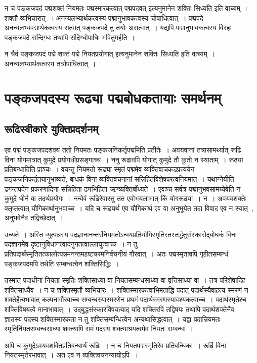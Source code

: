 				न च पङ्कजपदं पद्मशक्तं नियमतः पद्मस्मारकत्वात् पद्मपदवत् इत्यनुमानेन शक्तिः सिध्यति इति वाच्यम्~।  शक्तौ व्यभिचारात्~।  अनन्यलभ्यार्थकत्वस्य  पद्मानुभावकत्वस्य चोपाधित्वात्~। पद्मपदे अनन्यलभ्यपद्मार्थकत्वस्य सत्वात् पङ्कजपदे तु तयोः असत्वात्~।  यद्यपि पद्मानुभावकत्वस्य विरहः पङ्कजपदे सन्दिग्धः तथापि संदिग्धोपाधिः भवितुमर्हति~। 	

				न चैवं पङ्कजपदं पद्मे शक्तं पद्मे नियतप्रयोगात् इत्यनुमानेन शक्तिः सिध्यति इति वाच्यम्~।  अनन्यलभ्यार्थकत्वस्य तत्रोपाधित्वात्~। 

	\section{पङ्कजपदस्य रूढ्या पद्मबोधकतायाः समर्थनम्}
		
		\subsection{रूढिस्वीकारे युक्तिप्रदर्शनम्} 

			\begin{small}
			
				एवं पद्मं पङ्कजपदशक्यं ततो नियमतः पङ्कजनिकर्तृपद्ममिति प्रतीतेः~। अवयवानां तत्रासामर्थ्यात् रूढिं विना योगमात्रात् कुमुदे प्रयोगधीप्रसङ्गाच्च~। ननु रूढावपि योगात् कुमुदे तौ कुतो न स्याताम्~। रूढ्या प्रतिबन्धादिति प्राञ्चः~। वयन्तु नियमतो रूढ्या स्मृतं पद्ममेव व्यक्तिवाचकडप्रत्ययेन पङ्कजनिकर्तृतयानुभाव्यते, बाधकं विना व्यक्तिवचनानां सन्निहितविशेषपरत्वनियमात्~। यथाग्नेयीति ढगन्तपदेन प्रकरणादिना सन्निहिता ढगभिहिता ऋग्व्यक्तिर्बोध्यते~। एवञ्च सर्वत्र पद्मानुभवसामग्र्येवेति न कुमुदे धीर्न वा तदर्थप्रयोगः~। नन्वेवं रूढिरेवास्तु तत एवोभयलाभात् किं योगरूढ्या~। न~। अवयवशक्तेः क्लृप्तत्वात् यौगिकार्थानुभवाच्च~। यदि च रूढ्यर्थ एव यौगिकार्थ एव वा अनुभूयेत तदा विवाद एव न स्यात्~, अनुभवेनैव तद्विच्छेदात्~। 
				
				उच्यते~। अस्ति व्युत्पन्नस्य पदज्ञानानन्तरंनियमतोऽन्वयप्रतियोगिस्मृतिरतस्तद्धेतुसंस्कारोद्बोधकं विना पदज्ञानमेव दृष्टानुविधानत्वादनुगतत्वाल्लाघुत्वाच्च~। न तु प्रतिपदार्थस्मृतितत्कालोत्पन्नमनन्तमहष्टचरमनिर्वचनीयं गौरवात्~। अतः पद्मस्मृतावपि गृहीतसम्बन्धं पङ्कजपदमपि तथेति सम्बन्धत्वेन शक्तिसिद्धिः~। 
			
				तस्मात् पदाधीना नियता स्मृतिः शक्तिसाध्या वा नियतसम्बन्धसाध्या वा वृत्तिसाध्या वा~। तत्र परिशेषादिह शक्तिसाध्यैव~। न च शक्तिस्मृतौ व्यभिचारः~। शक्तिस्मारकत्वाभिमताद्धि पदात् पदार्थस्यैवाहत्य स्मरणं न शक्तेर्हेत्वभावात् कल्पनागौरवाच्च सम्बन्धस्यास्मरणेन प्रथमं पदार्थस्मरणस्यावश्यकत्वाच्च~। पदार्थस्मृतेश्च शक्तिविषयत्वे मानाभावात्~। उद्बुद्धसंस्कारविषयत्वाद् यदि शक्तिरपि तद्विषयः तथापि पदार्थशक्तेनैव ज्ञातस्य पदस्य शक्तिस्मारकता न तु शक्तिसम्बन्धित्वेन अन्यथासिद्धत्वात्~। यद्वा पदान्नियमतः स्मृतिर्नियतसम्बन्धसाध्या शक्त्यापि समं पदस्य शक्त्याश्रयत्वमेव नियतः सम्बन्धः~। 
			
				अपि च कुमुदेऽवयवशक्तिप्रतिबन्धार्थं रूढिः~। न च नियतपद्मस्मृतिरेव प्रतिबन्धिका~। रूढिं विना नियतस्मृतेरभावात्~। अत एव न व्यक्तिवचनन्यायोऽपि~। 
			\end{small}
			
